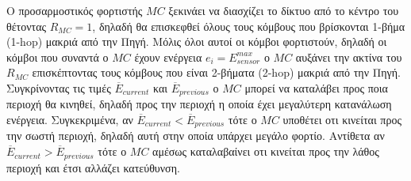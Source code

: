 Ο προσαρμοστικός φορτιστής $MC$ ξεκινάει να διασχίζει το δίκτυο από το κέντρο του θέτοντας $R_{MC}=1$, δηλαδή θα επισκεφθεί όλους τους κόμβους που βρίσκονται 1-βήμα
(1-hop) μακριά από την Πηγή. Μόλις όλοι αυτοί οι κόμβοι φορτιστούν, δηλαδή οι κόμβοι που συναντά ο $MC$ έχουν ενέργεια $e_{i} = E^{max}_{sensor}$ ο $MC$ αυξάνει την
ακτίνα του $R_{MC}$ επισκέπτοντας τους κόμβους που είναι 2-βήματα (2-hop) μακριά από την Πηγή. Συγκρίνοντας τις τιμές $\overline{E}_{current}$ και
$\overline{E}_{previous}$ ο $MC$ μπορεί να καταλάβει προς ποια περιοχή θα κινηθεί, δηλαδή προς την περιοχή η οποία έχει μεγαλύτερη κατανάλωση ενέργεια. Συγκεκριμένα,
αν $\overline{E}_{current} < \overline{E}_{previous}$ τότε ο $MC$ υποθέτει οτι κινείται προς την σωστή περιοχή, δηλαδή αυτή στην οποία υπάρχει μεγάλο φορτίο.
Αντίθετα αν $\overline{E}_{current} > \overline{E}_{previous}$ τότε ο $MC$ αμέσως καταλαβαίνει οτι κινείται προς την λάθος περιοχή και έτσι αλλάζει κατεύθυνση.

